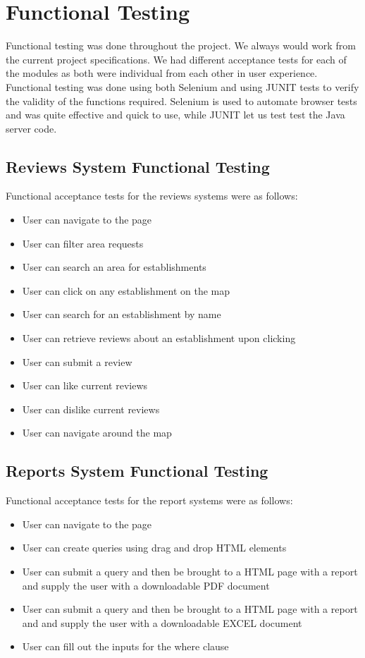 \section{Functional Testing}

Functional testing was done throughout the project. We always would work from the current project specifications. We had different acceptance tests for each of the modules as both were individual from each other in user experience. \newline \newline \noindent Functional testing was done using both Selenium and using JUNIT tests to verify the validity of the functions required. Selenium is used to automate browser tests and was quite effective and quick to use, while JUNIT let us test test the Java server code. 

\subsection{Reviews System Functional Testing}

Functional acceptance tests for the reviews systems were as follows:

\begin{itemize}
	\item User can navigate to the page
	\item User can filter area requests
	\item User can search an area for establishments
	\item User can click on any establishment on the map
	\item User can search for an establishment by name
	\item User can retrieve reviews about an establishment upon clicking
	\item User can submit a review
	\item User can like current reviews
	\item User can dislike current reviews
	\item User can navigate around the map
\end{itemize}

\subsection{Reports System Functional Testing}

Functional acceptance tests for the report systems were as follows:

\begin{itemize}
	\item User can navigate to the page
	\item User can create queries using drag and drop HTML elements
	\item User can submit a query and then be brought to a HTML page with a report and supply the user with a downloadable PDF document
	\item User can submit a query and then be brought to a HTML page with a report and and supply the user with a downloadable EXCEL document
	\item User can fill out the inputs for the where clause
\end{itemize}

